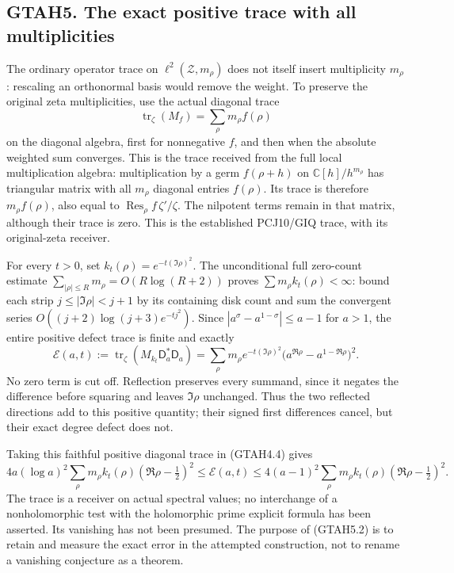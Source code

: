 \subsection{GTAH5. The exact positive trace with all
multiplicities}\label{gtah5.-the-exact-positive-trace-with-all-multiplicities}

The ordinary operator trace on \(\ell^2(\mathscr Z,m_\rho)\) does not
itself insert multiplicity \(m_\rho\): rescaling an orthonormal basis
would remove the weight. To preserve the original zeta multiplicities,
use the actual diagonal trace \[
\operatorname{tr}_\zeta(M_f)=\sum_\rho m_\rho f(\rho)
\tag{GTAH5.1}
\] on the diagonal algebra, first for nonnegative \(f\), and then when
the absolute weighted sum converges. This is the trace received from the
full local multiplication algebra: multiplication by a germ
\(f(\rho+h)\) on \(\mathbb C[h]/h^{m_\rho}\) has triangular matrix with
all \(m_\rho\) diagonal entries \(f(\rho)\). Its trace is therefore
\(m_\rho f(\rho)\), also equal to
\(\operatorname{Res}_\rho f\,\zeta'/\zeta\). The nilpotent terms remain
in that matrix, although their trace is zero. This is the established
PCJ10/GIQ trace, with its original-zeta receiver.

For every \(t>0\), set \(k_t(\rho)=e^{-t(\Im\rho)^2}\). The
unconditional full zero-count estimate
\(\sum_{|\rho|\le R}m_\rho=O(R\log(R+2))\) proves
\(\sum m_\rho k_t(\rho)<\infty\): bound each strip \(j\le|\Im\rho|<j+1\)
by its containing disk count and sum the convergent series
\(O((j+2)\log(j+3)e^{-tj^2})\). Since \(|a^\sigma-a^{1-\sigma}|\le a-1\)
for \(a>1\), the entire positive defect trace is finite and exactly \[
\mathcal E(a,t):=
\operatorname{tr}_\zeta(M_{k_t}\mathsf D_a^*\mathsf D_a)
=\sum_\rho m_\rho e^{-t(\Im\rho)^2}
\bigl(a^{\Re\rho}-a^{1-\Re\rho}\bigr)^2.
\tag{GTAH5.2}
\] No zero term is cut off. Reflection preserves every summand, since it
negates the difference before squaring and leaves \(\Im\rho\) unchanged.
Thus the two reflected directions add to this positive quantity; their
signed first differences cancel, but their exact degree defect does not.

Taking this faithful positive diagonal trace in (GTAH4.4) gives \[
4a(\log a)^2\sum_\rho m_\rho k_t(\rho)(\Re\rho-\tfrac12)^2
\le\mathcal E(a,t)
\le4(a-1)^2\sum_\rho m_\rho k_t(\rho)(\Re\rho-\tfrac12)^2.
\tag{GTAH5.3}
\] The trace is a receiver on actual spectral values; no interchange of
a nonholomorphic test with the holomorphic prime explicit formula has
been asserted. Its vanishing has not been presumed. The purpose of
(GTAH5.2) is to retain and measure the exact error in the attempted
construction, not to rename a vanishing conjecture as a theorem.

